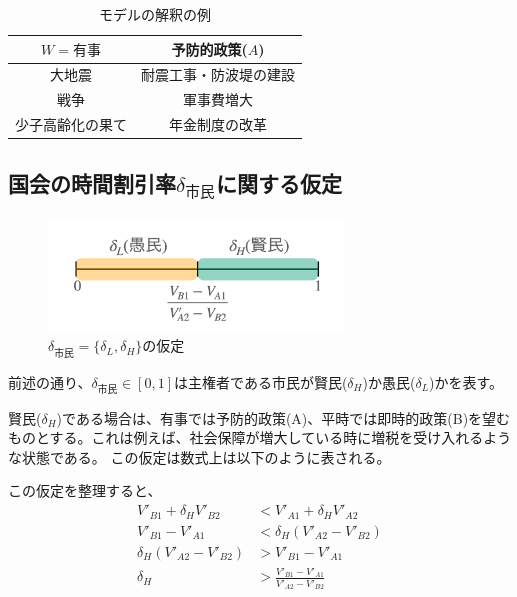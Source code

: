 \documentclass[main.tex]{subfiles}
\begin{document}
\begin{table}[htbp]
  \caption{モデルの解釈の例}
  \label{table:data_type}
  \centering
  \begin{tabular}{cc}
    \toprule
    $W=有事$ & 予防的政策($A$) \\
    \midrule
    大地震 & 耐震工事・防波堤の建設 \\
    戦争 & 軍事費増大 \\
    少子高齢化の果て & 年金制度の改革 \\
    \bottomrule
  \end{tabular}
\end{table}



\subsection{国会の時間割引率$\delta_{市民}$に関する仮定}

\begin{figure}[htbp]
  \centering
  \includegraphics[width=0.7\textwidth]{./image/assumption_citizen_discount_rate.png}
  \caption{$\delta_{市民}=\lbrace \delta_L, \delta_H \rbrace$の仮定} 
  \label{fig:assumption_citizen_discount_rate}
\end{figure}


前述の通り、$\delta_{市民}\in[0,1]$は主権者である市民が賢民($\delta_H$)か愚民($\delta_L$)かを表す。

賢民($\delta_H$)である場合は、有事では予防的政策(A)、平時では即時的政策(B)を望むものとする。これは例えば、社会保障が増大している時に増税を受け入れるような状態である。
この仮定は数式上は以下のように表される。

この仮定を整理すると、
\begin{align*}
  V'_{B1} + \delta_H V'_{B2} &< V'_{A1} + \delta_H V'_{A2}\\
  V'_{B1}-V'_{A1}  &<  \delta_H (V'_{A2} - V'_{B2}) \\
  \delta_H (V'_{A2} - V'_{B2}) &> V'_{B1}-V'_{A1} \\
  \delta_H &> \frac{V'_{B1}-V'_{A1}}{V'_{A2} - V'_{B2}}
\end{align*}
\end{document}

